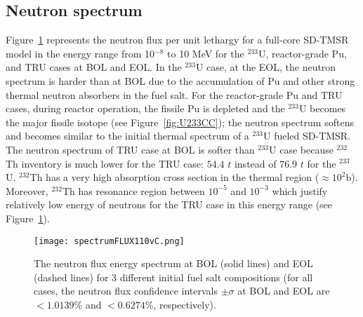 \subsection{Neutron spectrum}
Figure~\ref{fig:spectrumFLUX110vC} represents the neutron flux per unit 
lethargy for a full-core SD-TMSR model in the energy range from 10$^{-8}$ to 
10 MeV for the $^{233}$U, reactor-grade Pu, and TRU cases at BOL and EOL. In 
the $^{233}$U case, at the EOL, the neutron spectrum is harder than at BOL due 
to the accumulation of Pu and other strong thermal neutron absorbers in the 
fuel salt. For the reactor-grade Pu and TRU cases, during reactor operation, 
the fissile Pu is depleted and the $^{233}$U becomes the major fissile isotope 
(see Figure~\ref{fig:U233CC}); the neutron spectrum softens and becomes 
similar to the initial thermal spectrum of a $^{233}$U fueled SD-TMSR.
The neutron spectrum of TRU case at BOL is softer than $^{233}$U case because $^{232}$Th inventory is much lower for the TRU case: $54.4$ $t$ instead of $76.9$ $t$ for the $^{233}$U. $^{232}$Th has a very high absorption cross section in the thermal region ($\approx10^2 $b). Moreover, $^{232}$Th has resonance region between $10^{-5}$ and $10^{-3}$ which justify relatively low energy of neutrons for the TRU case in this energy range (see Figure~\ref{fig:spectrumFLUX110vC}).
 \begin{figure}
 	\centering
 	\texttt{[image: spectrumFLUX110vC.png]}
 			\vspace{-0.4in}
 	\caption{The neutron flux energy spectrum at BOL (solid lines) and EOL (dashed lines) for 3 different initial 
 		fuel salt compositions (for all cases, the neutron flux
 		confidence intervals $\pm\sigma$ at BOL and EOL are $<1.0139$\% and $<0.6274$\%, respectively).}
 	\label{fig:spectrumFLUX110vC}
\end{figure}

